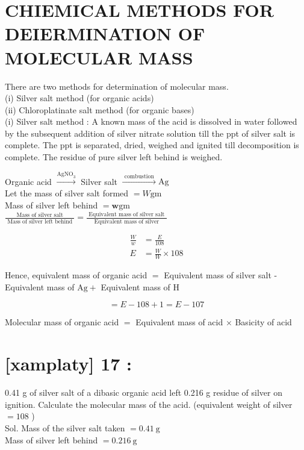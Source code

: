 \documentclass[10pt]{article}
\begin{document}
\section*{CHIEMICAL METHODS FOR DEIERMINATION OF MOLECULAR MASS}
There are two methods for determination of molecular mass.\\
(i) Silver salt method (for organic acids)\\
(ii) Chloroplatinate salt method (for organic bases)\\
(i) Silver salt method : A known mass of the acid is dissolved in water followed by the subsequent addition of silver nitrate solution till the ppt of silver salt is complete. The ppt is separated, dried, weighed and ignited till decomposition is complete. The residue of pure silver left behind is weighed.

Organic acid $\xrightarrow{\mathrm{AgNO}_{3}}$ Silver salt $\xrightarrow{\text { combustion }} \mathrm{Ag}$\\
Let the mass of silver salt formed $=W \mathrm{gm}$\\
Mass of silver left behind $=\mathbf{w} \mathrm{gm}$\\
$\frac{\text { Mass of silver salt }}{\text { Mass of silver left behind }}=\frac{\text { Equivalent mass of silver salt }}{\text { Equivalent mass of silver }}$

$$
\begin{aligned}
\frac{W}{w} & =\frac{E}{108} \\
E & =\frac{W}{W} \times 108
\end{aligned}
$$

Hence, equivalent mass of organic acid $=$ Equivalent mass of silver salt - Equivalent mass of $\mathrm{Ag}+$ Equivalent mass of H

$$
=E-108+1=E-107
$$

Molecular mass of organic acid $=$ Equivalent mass of acid $\times$ Basicity of acid

\section*{[xamplaty] 17 :}
0.41 g of silver salt of a dibasic organic acid left 0.216 g residue of silver on ignition. Calculate the molecular mass of the acid. (equivalent weight of silver $=108$ )\\
Sol. Mass of the silver salt taken $=0.41 \mathrm{~g}$\\
Mass of silver left behind $=0.216 \mathrm{~g}$
\end{document}
